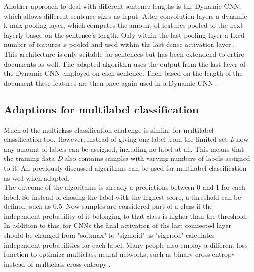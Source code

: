 Another approach to deal with different sentence lengths is the Dynamic CNN, which allows different sentence-sizes as input. After convolution layers a dynamic k-max-pooling layer, which computes the amount of features pooled to the next layerly based on the sentence's length. Only within the last pooling layer a fixed number of features is pooled and used within the last dense activation layer \cite{kalchbrenner2014convolutional}.\\
This architecture is only suitable for sentences but has been extendend to entire documents as well. The adapted algorithm uses the output from the last layer of the Dynamic CNN employed on each sentence. Then based on the length of the document these features are then once again used in a Dynamic CNN \cite{denil2014modelling}.

\subsection{Adaptions for multilabel classification}
Much of the multiclass classification challenge is similar for multilabel classification too. However, instead of giving one label from the limited set \textit{L} now any amount of labels can be assigned, including no label at all. This means that the training data \textit{D} also contains samples with varying numbers of labels assigned to it. All previously discussed algorithms can be used for multilabel classification as well when adapted.\\
The outcome of the algorithms is already a predictions between 0 and 1 for each label. So instead of chosing the label with the highest score, a threshold can be defined, such as 0.5. Now samples are considered part of a class if the independent probability of it belonging to that class is higher than the threshold.\\
In addition to this, for CNNs the final activation of the last connected layer should be changed from "softmax" to "sigmoid" as "sigmoid" calculates independent probabilities for each label. Many people also employ a different loss function to optimize multiclass neural networks, such as binary cross-entropy instead of multiclass cross-entropy \cite{nam2014large} \cite{Multiclass}.

